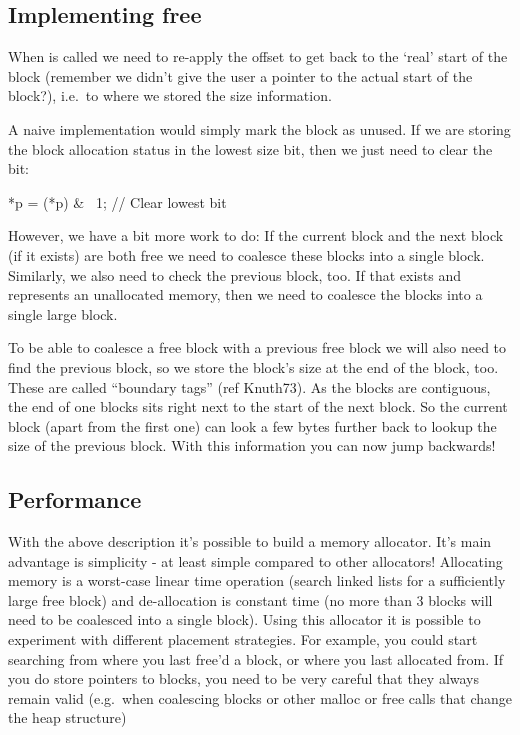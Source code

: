 \subsection{Implementing free}

When  is called we need to re-apply the offset to get back to the `real' start of the block (remember we didn't give the user a pointer to the actual start of the block?), i.e.~to where we stored the size information.

A naive implementation would simply mark the block as unused. If we are storing the block allocation status in the lowest size bit, then we just need to clear the bit:

\begin{code}[language=C]
*p = (*p) & ~1; // Clear lowest bit 
\end{code}

However, we have a bit more work to do: If the current block and the next block (if it exists) are both free we need to coalesce these blocks into a single block. Similarly, we also need to check the previous block, too. If that exists and represents an unallocated memory, then we need to coalesce the blocks into a single large block.

To be able to coalesce a free block with a previous free block we will also need to find the previous block, so we store the block's size at the end of the block, too. These are called ``boundary tags'' (ref Knuth73). As the blocks are contiguous, the end of one blocks sits right next to the start of the next block. So the current block (apart from the first one) can look a few bytes further back to lookup the size of the previous block. With this information you can now jump backwards!

\subsection{Performance}

With the above description it's possible to build a memory allocator. It's main advantage is simplicity - at least simple compared to other allocators! Allocating memory is a worst-case linear time operation (search linked lists for a sufficiently large free block) and de-allocation is constant time (no more than 3 blocks will need to be coalesced into a single block). Using this allocator it is possible to experiment with different placement strategies. For example, you could start searching from where you last free'd a block, or where you last allocated from. If you do store pointers to blocks, you need to be very careful that they always remain valid (e.g.~when coalescing blocks or other malloc or free calls that change the heap structure)

